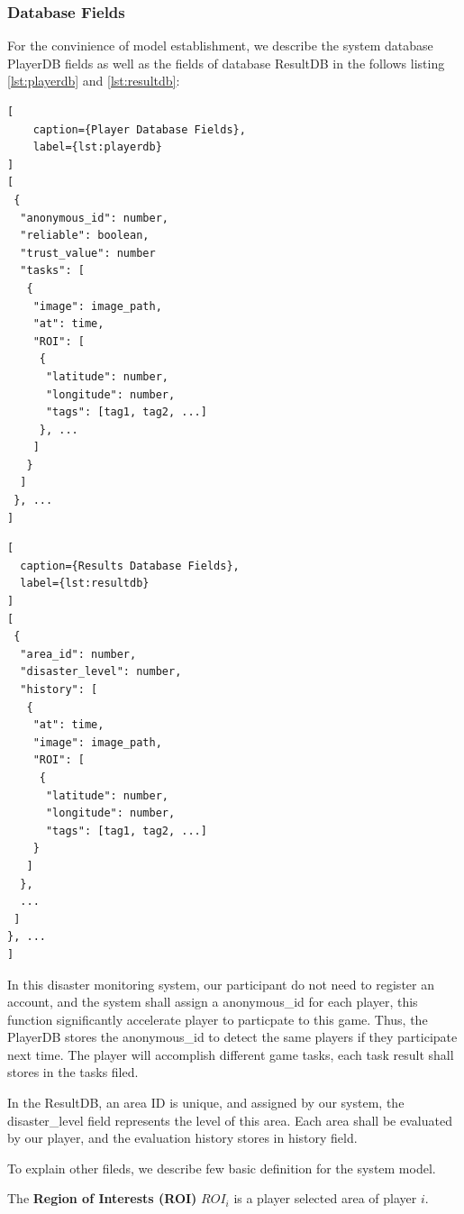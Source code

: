 \subsubsection{Database Fields}

  For the convinience of model establishment, we describe the system database PlayerDB 
  fields as well as the fields of database ResultDB in the follows listing \ref{lst:playerdb}
  and \ref{lst:resultdb}:

\noindent\begin{minipage}{.45\textwidth}
\begin{lstlisting}[
    caption={Player Database Fields},
    label={lst:playerdb}
]
[
 {
  "anonymous_id": number,
  "reliable": boolean,
  "trust_value": number
  "tasks": [
   {
    "image": image_path,
    "at": time, 
    "ROI": [
     {
      "latitude": number,
      "longitude": number,
      "tags": [tag1, tag2, ...]
     }, ...
    ]
   }
  ]
 }, ...
]
\end{lstlisting}
\end{minipage}\hfill
\begin{minipage}{.45\textwidth}
\begin{lstlisting}[
  caption={Results Database Fields},
  label={lst:resultdb}
]
[
 {
  "area_id": number,
  "disaster_level": number,
  "history": [
   {
    "at": time,
    "image": image_path,
    "ROI": [
     {
      "latitude": number,
      "longitude": number,
      "tags": [tag1, tag2, ...]
    }
   ]
  }, 
  ...
 ]
}, ...
]
\end{lstlisting}
\end{minipage}

  In this disaster monitoring system, our participant do not need to register an account,
  and the system shall assign a anonymous\_id for each player, this function significantly 
  accelerate player to particpate to this game. Thus, the PlayerDB stores the anonymous\_id
  to detect the same players if they participate next time. The player will accomplish different
  game tasks, each task result shall stores in the tasks filed.

  In the ResultDB, an area ID is unique, and assigned by our system, the disaster\_level field
  represents the level of this area. Each area shall be evaluated by our player, and the evaluation
  history stores in history field.

  To explain other fileds, we describe few basic definition for the system model.

  \begin{definition}
  \label{def:roi}
  The \textbf{Region of Interests (ROI)} $ROI_i$ is a player selected area of player $i$.
  \end{definition}

